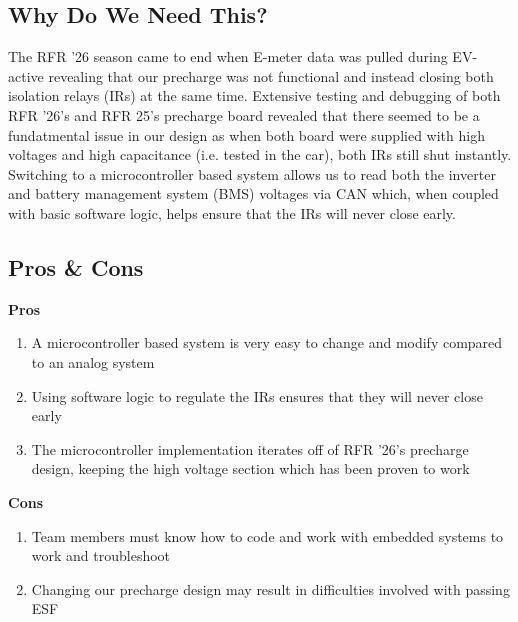 \documentclass{article}
\begin{document}
\subsection{Why Do We Need This?}
The RFR '26 season came to end when E-meter data was pulled during EV-active revealing that our precharge was not functional and instead closing both isolation relays (IRs) at the same time. Extensive testing and debugging of both RFR '26's and RFR 25's precharge board revealed that there seemed to be a fundatmental issue in our design as when both board were supplied with high voltages and high capacitance (i.e. tested in the car), both IRs still shut instantly. Switching to a microcontroller based system allows us to read both the inverter and battery management system (BMS) voltages via CAN which, when coupled with basic software logic, helps ensure that the IRs will never close early.

\subsection{Pros \& Cons}
\begin{minipage}[t]{0.45\linewidth}
	\begin{center}
		\textbf{Pros}
		\begin{enumerate}
			\item A microcontroller based system is very easy to change and modify compared to an analog system
			\item Using software logic to regulate the IRs ensures that they will never close early
			\item The microcontroller implementation iterates off of RFR '26's precharge design, keeping the high voltage section which has been proven to work
		\end{enumerate}
	\end{center}
\end{minipage}
\hfill
\begin{minipage}[t]{0.45\linewidth}
	\begin{center}
		\textbf{Cons}
		\begin{enumerate}
			\item Team members must know how to code and work with embedded systems to work and troubleshoot
			\item Changing our precharge design may result in difficulties involved with passing ESF
		\end{enumerate}
	\end{center}
\end{minipage}
\end{document}

